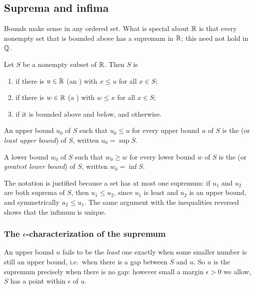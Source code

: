\subsection{Suprema and infima}
Bounds make sense in any ordered set. What is special about $\mathbb{R}$ is that
every nonempty set that is bounded above has a supremum in $\mathbb{R}$; this need
not hold in $\mathbb{Q}$.

\begin{defi}
  Let $S$ be a nonempty subset of $\mathbb{R}$. Then $S$ is
  \begin{enumerate}
    \item {} if there is $u \in \mathbb{R}$ (an )
      with $x \leq u$ for all $x \in S$;
    \item {} if there is $w \in \mathbb{R}$ (a )
      with $w \leq x$ for all $x \in S$;
    \item {} if it is bounded above and below, and
       otherwise.
  \end{enumerate}
\end{defi}

\begin{defi}
  An upper bound $u_0$ of $S$ such that $u_0 \leq u$ for every upper bound
  $u$ of $S$ is the  (or \emph{least upper bound}) of $S$,
  written $u_0 = \sup S$.

  A lower bound $w_0$ of $S$ such that $w_0 \geq w$ for every lower bound $w$
  of $S$ is the  (or \emph{greatest lower bound}) of $S$,
  written $w_0 = \inf S$.
\end{defi}

The notation is justified because a set has at most one supremum: if $u_1$
and $u_2$ are both suprema of $S$, then $u_1 \leq u_2$, since $u_1$ is least
and $u_2$ is an upper bound, and symmetrically $u_2 \leq u_1$. The same
argument with the inequalities reversed shows that the infimum is unique.

\subsubsection*{The \texorpdfstring{$\epsilon$}{epsilon}-characterization of the supremum}
An upper bound $u$ fails to be the \emph{least} one exactly when some smaller
number is still an upper bound, i.e.\ when there is a gap between $S$ and
$u$. So $u$ is the supremum precisely when there is no gap: however small a
margin $\epsilon > 0$ we allow, $S$ has a point within $\epsilon$ of $u$.

